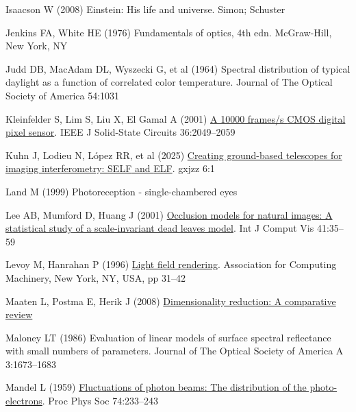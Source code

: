 \documentclass[
  letterpaper,
]{book}
\newlength{\cslhangindent}
\newenvironment{CSLReferences}[2] %
 {\begin{list}{}{%
  \setlength{\itemindent}{0pt}
  \setlength{\leftmargin}{0pt}
  \setlength{\parsep}{0pt}
  \ifodd #1
   \setlength{\leftmargin}{\cslhangindent}
   \setlength{\itemindent}{-1\cslhangindent}
  \fi
  \setlength{\itemsep}{#2\baselineskip}}}
 {\end{list}}
\begin{document}
\begin{CSLReferences}{1}{1}
Isaacson W (2008) Einstein: His life and universe. Simon; Schuster

Jenkins FA, White HE (1976) Fundamentals of optics, 4th edn.
McGraw-Hill, New York, NY

Judd DB, MacAdam DL, Wyszecki G, et al (1964) Spectral distribution of
typical daylight as a function of correlated color temperature. Journal
of The Optical Society of America 54:1031

Kleinfelder S, Lim S, Liu X, El Gamal A (2001)
\href{http://dx.doi.org/10.1109/4.972156}{A 10000 frames/s {CMOS}
digital pixel sensor}. IEEE J Solid-State Circuits 36:2049--2059

Kuhn J, Lodieu N, López RR, et al (2025)
\href{http://dx.doi.org/10.37188/lam.2025.033}{Creating ground-based
telescopes for imaging interferometry: {SELF} and {ELF}}. gxjzz 6:1

Land M (1999) Photoreception - single-chambered eyes

Lee AB, Mumford D, Huang J (2001)
\href{http://dx.doi.org/10.1023/a:1011109015675}{Occlusion models for
natural images: A statistical study of a scale-invariant dead leaves
model}. Int J Comput Vis 41:35--59

Levoy M, Hanrahan P (1996)
\href{https://doi.org/10.1145/237170.237199}{Light field rendering}.
Association for Computing Machinery, New York, NY, USA, pp 31--42

Maaten L, Postma E, Herik J (2008)
\href{https://www.researchgate.net/profile/Eric-Postma/publication/228657549_Dimensionality_Reduction_A_Comparative_Review/links/0046353a3047fc2863000000/Dimensionality-Reduction-A-Comparative-Review.pdf}{Dimensionality
reduction: A comparative review}

Maloney LT (1986) Evaluation of linear models of surface spectral
reflectance with small numbers of parameters. Journal of The Optical
Society of America A 3:1673--1683

Mandel L (1959)
\href{http://dx.doi.org/10.1088/0370-1328/74/3/301}{Fluctuations of
photon beams: The distribution of the photo-electrons}. Proc Phys Soc
74:233--243


\end{CSLReferences}
\end{document}
